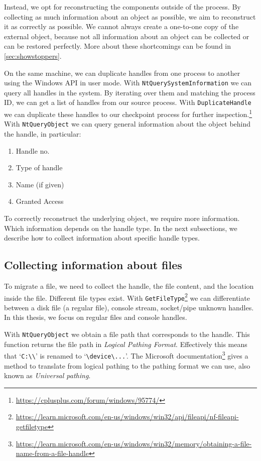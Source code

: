 \documentclass[a4paper, 11pt, english]{report}
\begin{document}
Instead, we opt for reconstructing the components outside of the process. By collecting as much information about an object as possible, we aim to reconstruct it as correctly as possible. We cannot always create a one-to-one copy of the external object, because not all information about an object can be collected or can be restored perfectly.
More about these shortcomings can be found in \autoref{sec:showstoppers}.

On the same machine, we can duplicate handles from one process to another using the Windows API in user mode.
With \texttt{NtQuerySystemInformation} we can query all handles in the system. By iterating over them and matching the process ID, we can get a list of handles from our source process. With \texttt{DuplicateHandle} we can duplicate these handles to our checkpoint process for further inspection.\footnote{\url{https://cplusplus.com/forum/windows/95774/}} With \texttt{NtQueryObject} we can query general information about the object behind the handle, in particular:
\begin{enumerate}
	\item Handle no.
	\item Type of handle
	\item Name (if given)
	\item Granted Access
\end{enumerate}

To correctly reconstruct the underlying object, we require more information. Which information depends on the handle type. In the next subsections, we describe how to collect information about specific handle types.


\subsection{Collecting information about files}
To migrate a file, we need to collect the handle, the file content, and the location inside the file.
Different file types exist.
With \texttt{GetFileType}\footnote{\url{https://learn.microsoft.com/en-us/windows/win32/api/fileapi/nf-fileapi-getfiletype}} we can differentiate between a disk file (a regular file), console stream, socket/pipe unknown handles. In this thesis, we focus on regular files and console handles.

With \texttt{NtQueryObject} we obtain a file path that corresponds to the handle. This function returns the file path in \textit{Logical Pathing Format}. Effectively this means that `\texttt{C:\textbackslash\textbackslash}' is renamed to `\texttt{\textbackslash device\textbackslash...}'. The Microsoft documentation\footnote{\url{https://learn.microsoft.com/en-us/windows/win32/memory/obtaining-a-file-name-from-a-file-handle}} gives a method to translate from logical pathing to the pathing format we can use, also known as \textit{Universal pathing}.
\end{document}
